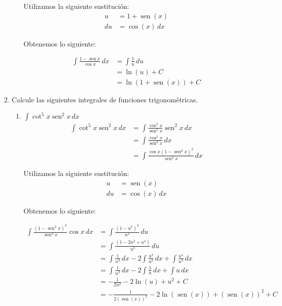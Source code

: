 \documentclass[a4paper,10pt]{article}
\newcommand{\dis}{\displaystyle}
\def\sin{\operatorname{sen}}
\begin{document}
\begin{enumerate}
\begin{enumerate}[label=\emph{\alph*)}]
Utilizamos la siguiente sustitución:
\begin{align*}
u  &=  1 + \sin(x)      \\
du &= \cos(x)  \, dx
\end{align*}
\dotfill [1 punto]

Obtenemos lo siguiente:



\begin{align*}
 \dis \int \frac{1-\sin x}{\cos x}\, dx  &=  \int \frac{1}{u}  \, du\\
							     &=  \ln (u) + C \\
                                 &=  \ln (1+ \sin(x)) + C
\end{align*}

\end{enumerate}
\dotfill [1 punto]
\newpage

\item Calcule las siguientes integrales de funciones
trigonom\'{e}tricas.
\begin{enumerate}[label=\emph{\alph*)}]
\item $\dis \int \cot^5 x\sin^2 x\, dx$
\begin{align*}
 \dis \int \cot^5 x\sin^2 x\, dx  &=    \dis \int \frac{\cos^5 x}{\sin^5 x}\sin^2 x\, dx\\
 										 &=    \dis \int \frac{\cos^5 x}{\sin^3 x}\, dx\\
                                         &=    \dis \int \frac{\cos x (1-\sin^2 x)^2 }{\sin^3 x}\, dx
\end{align*}


Utilizamos la siguiente sustitución:
\begin{align*}
u  &= \sin(x)      \\
du &= \cos(x)  \, dx
\end{align*}
\dotfill [1 punto]

Obtenemos lo siguiente:

\begin{align*}
 \dis \int \frac{ (1-\sin^2 x)^2 }{\sin^3 x}\cos x \, dx  &=    \dis \int \frac{(1-u^2)^2 }{u^3}\, du\\
 										 &=    \dis \int \frac{(1-2u^2 + u^4) }{u^3}\, du\\
                                         &=    \dis \int \frac{1}{u^3 }\, dx - 2 \int \frac{u^2}{u^3 }\, dx + \int \frac{u^4}{u^3 }\, dx\\
                                         &=    \dis \int \frac{1}{u^3 }\, dx - 2 \int \frac{1}{u }\, dx + \int u\, dx\\
                                         &=    \dis -\frac{1}{2u^2 } - 2 \ln(u) +  u^2 + C\\
                                         &=    \dis -\frac{1}{2(\sin(x))^2 } - 2 \ln(\sin(x)) +  (\sin(x))^2 + C
\end{align*}
\dotfill [1 punto]


\end{enumerate}
\end{enumerate}
\end{document}

